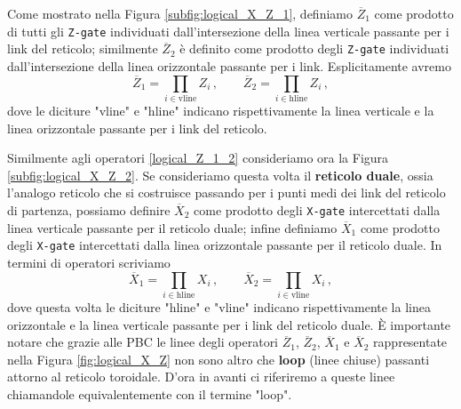 \noindent Come mostrato nella Figura \ref{subfig:logical_X_Z_1}, definiamo $\overline{Z}_1$ come prodotto di tutti gli \texttt{Z-gate} individuati dall'intersezione della linea verticale passante per i link del reticolo; similmente $\overline{Z}_2$ è definito come prodotto degli \texttt{Z-gate} individuati dall'intersezione della linea orizzontale passante per i link. Esplicitamente avremo
\begin{equation}\label{logical_Z_1_2}
    \overline{Z}_1 = \prod_{i \in \text{vline}} Z_i \, , \qquad \overline{Z}_2 = \prod_{i \in \text{hline}} Z_i \, ,
\end{equation}
dove le diciture "vline" e "hline" indicano rispettivamente la linea verticale e la linea orizzontale passante per i link del reticolo. 

\noindent Similmente agli operatori \eqref{logical_Z_1_2} consideriamo ora la Figura \ref{subfig:logical_X_Z_2}. Se consideriamo questa volta il \textbf{reticolo duale}, ossia l'analogo reticolo che si costruisce passando per i punti medi dei link del reticolo di partenza, possiamo definire $\overline{X}_2$ come prodotto degli \texttt{X-gate} intercettati dalla linea verticale passante per il reticolo duale; infine definiamo $\overline{X}_1$ come prodotto degli \texttt{X-gate} intercettati dalla linea orizzontale passante per il reticolo duale. In termini di operatori scriviamo
\begin{equation}\label{logical_X_1_2}
    \overline{X}_1 = \prod_{i \in \text{hline}} X_i \, , \qquad \overline{X}_2 = \prod_{i \in \text{vline}} X_i \, ,
\end{equation}
dove questa volta le diciture "hline" e "vline" indicano rispettivamente la linea orizzontale e la linea verticale passante per i link del reticolo duale. È importante notare che grazie alle PBC le linee degli operatori $\overline{Z}_1$, $\overline{Z}_2$, $\overline{X}_1$ e $\overline{X}_2$ rappresentate nella Figura \ref{fig:logical_X_Z} non sono altro che \textbf{loop} (linee chiuse) passanti attorno al reticolo toroidale. D'ora in avanti ci riferiremo a queste linee chiamandole equivalentemente con il termine "loop".  

